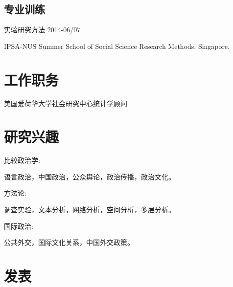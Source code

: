 \documentclass[10.5pt,]{article}
\providecommand{\tightlist}{%
  \setlength{\itemsep}{0pt}\setlength{\parskip}{0pt}}
\renewenvironment{itemize}{
  \begin{list}{}{
    \setlength{\leftmargin}{1.5em}
  }
}{
  \end{list}
}
\begin{document}
\subsection{专业训练}

\begin{itemize}
\tightlist
\item
  实验研究方法 \hfill 2014-06/07

  \begin{itemize}
  \tightlist
  \item
    \footnotesize IPSA-NUS Summer School of Social Science Research
    Methods, Singapore.
  \end{itemize}
\end{itemize}

\section{工作职务}

\begin{itemize}
\tightlist
\item
  美国爱荷华大学社会研究中心统计学顾问
\end{itemize}

\section{研究兴趣}

\begin{itemize}
\tightlist
\item
  比较政治学:

  \begin{itemize}
  \tightlist
  \item
    语言政治，中国政治，公众舆论，政治传播，政治文化。
  \end{itemize}
\item
  方法论:

  \begin{itemize}
  \tightlist
  \item
    调查实验，文本分析，网络分析，空间分析，多层分析。
  \end{itemize}
\item
  国际政治:

  \begin{itemize}
  \tightlist
  \item
    公共外交，国际文化关系，中国外交政策。
  \end{itemize}
\end{itemize}

\section{发表}
\end{document}
